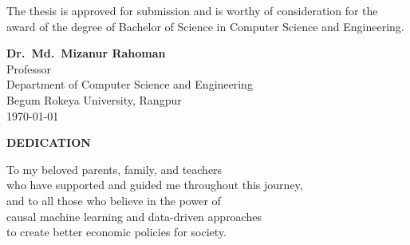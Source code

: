 \vspace{1cm}

The thesis is approved for submission and is worthy of consideration for the award of the degree of Bachelor of Science in Computer Science and Engineering.

\vspace{3cm}

\begin{flushright}
    \textbf{Dr.\ Md.\ Mizanur Rahoman}\\
    Professor\\
    Department of Computer Science and Engineering\\
    Begum Rokeya University, Rangpur\\
    \today
\end{flushright}

\newpage
\thispagestyle{empty}
\vspace*{4cm}

\begin{center}
    {\Large\bfseries DEDICATION}
\end{center}

\vspace{2cm}

\begin{center}
    To my beloved parents, family, and teachers\\
    who have supported and guided me throughout this journey,\\
    and to all those who believe in the power of\\
    causal machine learning and data-driven approaches\\
    to create better economic policies for society.
\end{center}    

\newpage